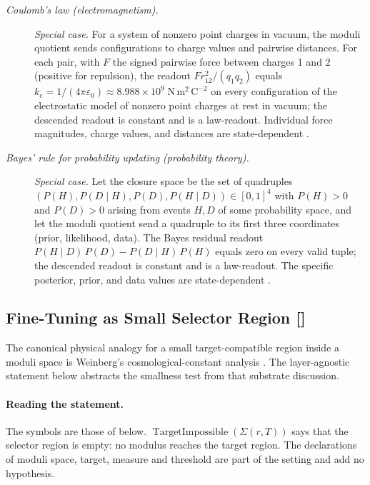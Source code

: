 \begin{description}
\item[\emph{Coulomb's law (electromagnetism).}] \textit{Special case.}
For a system of nonzero point charges in vacuum, the
moduli quotient sends configurations to charge values and pairwise
distances.  For each pair, with \(F\) the signed pairwise force
between charges 1 and 2 (positive for repulsion), the readout
\(F r_{12}^2/(q_1 q_2)\) equals
\(k_e=1/(4\pi\varepsilon_0)\approx8.988\times 10^9\;\mathrm{N\,m^2\,C^{-2}}\)
on every configuration of the electrostatic model of nonzero point charges at
rest in vacuum; the
descended readout is constant and is a law-readout.
Individual force magnitudes, charge values, and
distances are state-dependent
\citep{Coulomb1785Memoires}.

\item[\emph{Bayes' rule for probability updating
(probability theory).}] \textit{Special case.}
Let the closure space be the set of quadruples
\((P(H),P(D\mid H),P(D),P(H\mid D))\in[0,1]^4\) with \(P(H)>0\) and \(P(D)>0\) arising from
events \(H,D\) of some probability space, and let the moduli quotient send a
quadruple to its first three coordinates (prior, likelihood, data).  The Bayes residual
readout \(P(H\mid D)\,P(D)-P(D\mid H)\,P(H)\)
equals zero on every valid tuple; the descended
readout is constant and is a law-readout.  The
specific posterior, prior, and data values are
state-dependent \citep{Bayes1763Essay}.
\end{description}
\endgroup

\subsection{Fine-Tuning as Small Selector Region [\texorpdfstring{}{F47}]}\label{sec:self-reference-limits:fine-tuning}

The canonical physical analogy for a small target-compatible region
inside a moduli space is Weinberg's cosmological-constant analysis
\citep{Weinberg1989CosmologicalConstant}.  The layer-agnostic
statement below abstracts the smallness test from that substrate
discussion.

\paragraph{Reading the statement.} The symbols are those of  below.
\(\operatorname{TargetImpossible}(\Sigma(r,T))\) says that the selector
region is empty: no modulus reaches the target region. The declarations
of moduli space, target, measure and threshold are part of the setting and
add no hypothesis.

